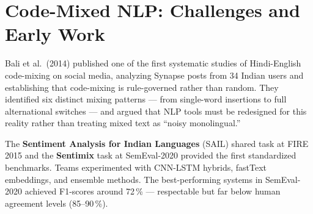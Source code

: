 \section{Code-Mixed NLP: Challenges and Early Work}

Bali et al.\ (2014) \cite{bali2014} published one of the first systematic studies of Hindi-English code-mixing on social media, analyzing Synapse posts from 34 Indian users and establishing that code-mixing is rule-governed rather than random. They identified six distinct mixing patterns — from single-word insertions to full alternational switches — and argued that NLP tools must be redesigned for this reality rather than treating mixed text as ``noisy monolingual.''

The \textbf{Sentiment Analysis for Indian Languages} (SAIL) shared task at FIRE 2015 \cite{patra2015} and the \textbf{Sentimix} task at SemEval-2020 \cite{patwa2020} provided the first standardized benchmarks. Teams experimented with CNN-LSTM hybrids, fastText embeddings, and ensemble methods. The best-performing systems in SemEval-2020 achieved F1-scores around 72\,\% — respectable but far below human agreement levels (85--90\,\%).
